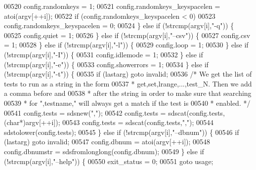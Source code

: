 \begin{DoxyCode}
{{{{{{{{{{{{{{{{{00520             config.randomkeys = 1;
00521             config.randomkeys\_keyspacelen = atoi(argv[++i]);
00522             \textcolor{keywordflow}{if} (config.randomkeys\_keyspacelen < 0)
00523                 config.randomkeys\_keyspacelen = 0;
00524         \} \textcolor{keywordflow}{else} \textcolor{keywordflow}{if} (!strcmp(argv[i],\textcolor{stringliteral}{"-q"})) \{
00525             config.quiet = 1;
00526         \} \textcolor{keywordflow}{else} \textcolor{keywordflow}{if} (!strcmp(argv[i],\textcolor{stringliteral}{"--csv"})) \{
00527             config.csv = 1;
00528         \} \textcolor{keywordflow}{else} \textcolor{keywordflow}{if} (!strcmp(argv[i],\textcolor{stringliteral}{"-l"})) \{
00529             config.loop = 1;
00530         \} \textcolor{keywordflow}{else} \textcolor{keywordflow}{if} (!strcmp(argv[i],\textcolor{stringliteral}{"-I"})) \{
00531             config.idlemode = 1;
00532         \} \textcolor{keywordflow}{else} \textcolor{keywordflow}{if} (!strcmp(argv[i],\textcolor{stringliteral}{"-e"})) \{
00533             config.showerrors = 1;
00534         \} \textcolor{keywordflow}{else} \textcolor{keywordflow}{if} (!strcmp(argv[i],\textcolor{stringliteral}{"-t"})) \{
00535             \textcolor{keywordflow}{if} (lastarg) \textcolor{keywordflow}{goto} invalid;
00536             \textcolor{comment}{/* We get the list of tests to run as a string in the form}
00537 \textcolor{comment}{             * get,set,lrange,...,test\_N. Then we add a comma before and}
00538 \textcolor{comment}{             * after the string in order to make sure that searching}
00539 \textcolor{comment}{             * for ",testname," will always get a match if the test is}
00540 \textcolor{comment}{             * enabled. */}
00541             config.tests = sdsnew(\textcolor{stringliteral}{","});
00542             config.tests = sdscat(config.tests,(\textcolor{keywordtype}{char}*)argv[++i]);
00543             config.tests = sdscat(config.tests,\textcolor{stringliteral}{","});
00544             sdstolower(config.tests);
00545         \} \textcolor{keywordflow}{else} \textcolor{keywordflow}{if} (!strcmp(argv[i],\textcolor{stringliteral}{"--dbnum"})) \{
00546             \textcolor{keywordflow}{if} (lastarg) \textcolor{keywordflow}{goto} invalid;
00547             config.dbnum = atoi(argv[++i]);
00548             config.dbnumstr = sdsfromlonglong(config.dbnum);
00549         \} \textcolor{keywordflow}{else} \textcolor{keywordflow}{if} (!strcmp(argv[i],\textcolor{stringliteral}{"--help"})) \{
00550             exit\_status = 0;
00551             \textcolor{keywordflow}{goto} usage;
}}}}}}}}}}}}}}}}}
\end{DoxyCode}
